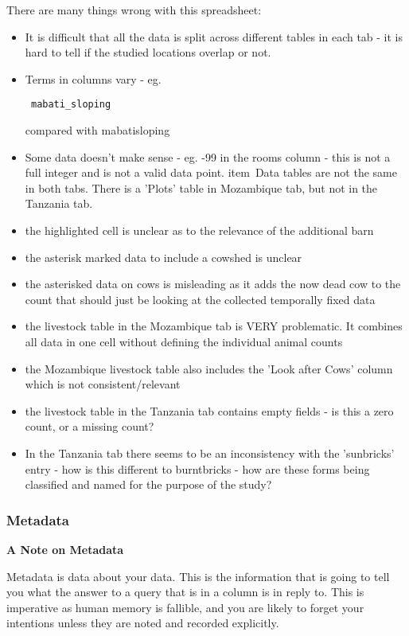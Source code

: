 \documentclass{article}
\begin{document}
There are many things wrong with this spreadsheet:
\begin{itemize}
    \item It is difficult that all the data is split across different tables in each tab - it is hard to tell if the studied locations overlap or not. 
    \item Terms in columns vary - eg. \begin{verbatim} mabati_sloping
    \end{verbatim} compared with mabatisloping
    \item Some data doesn't make sense - eg. -99 in the rooms column - this is not a full integer and is not a valid data point. 
    item\ Data tables are not the same in both tabs. There is a 'Plots' table in Mozambique tab, but not in the Tanzania tab.
    \item the highlighted cell is unclear as to the relevance of the additional barn
    \item the asterisk marked data to include a cowshed is unclear
    \item the asterisked data on cows is misleading as it adds the now dead cow to the count that should just be looking at the collected temporally fixed data
    \item the livestock table in the Mozambique tab is VERY problematic. It combines all data in one cell without defining the individual animal counts
    \item the Mozambique livestock table also includes the 'Look after Cows' column which is not consistent/relevant
    \item the livestock table in the Tanzania tab contains empty fields - is this a zero count, or a missing count?
    \item In the Tanzania tab there seems to be an inconsistency with the 'sunbricks' entry - how is this different to burntbricks - how are these forms being classified and named for the purpose of the study?
    \end{itemize}

\subsubsection{Metadata}
\textbf{A Note on Metadata}

Metadata is data about your data. This is the information that is going to tell you what the answer to a query that is in a column is in reply to. This is imperative as human memory is fallible, and you are likely to forget your intentions unless they are noted and recorded explicitly. 
\end{document}
